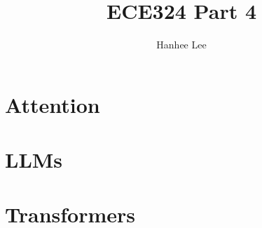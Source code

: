 \documentclass{article}
\title{ECE324 Part 4}
\author{Hanhee Lee}
\begin{document}
\section{Attention}

\newpage

\section{LLMs}

\newpage

\section{Transformers}

\end{document}
